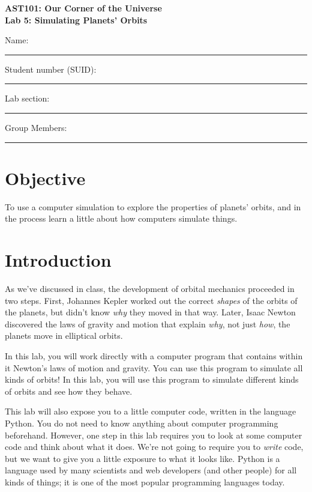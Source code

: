 \documentclass[11pt]{article}
\begin{document}
\begin{center}
\textbf{\Large
AST101: Our Corner of the Universe \\
\vspace*{0.1cm}
Lab 5: Simulating Planets' Orbits
}
\end{center}

\vspace*{0.5cm}

{\Large Name:}\vspace*{0.5cm}\\\hrule
{\Large Student number (SUID):}\vspace*{0.5cm}\\\hrule
{\Large Lab section:}\vspace*{0.5cm}\\\hrule
{\Large Group Members:}\vspace*{0.5cm}\\\hrule
\vspace*{0.5cm}


\section{Objective}

To use a computer simulation to explore the properties of planets' orbits, and in the process learn a little about how computers simulate things.

\section{Introduction}

As we've discussed in class, the development of orbital mechanics proceeded in two steps. First, Johannes Kepler worked out the correct {\it shapes} of the orbits of the planets, but didn't know {\it why} they moved in that way. Later, Isaac Newton discovered the laws of gravity and motion that explain {\it why}, not just {\it how}, the planets move in elliptical orbits.

In this lab, you will work directly with a computer program that contains within it Newton's laws of motion and gravity. You can use this program to simulate all kinds of orbits! In this lab, you will use this program to simulate different kinds of orbits and see how they behave.

This lab will also expose you to a little computer code, written in the language Python. You do not need to know anything about computer programming beforehand. However, one step in this lab requires you to look at some computer code and think about what it does. We're not going to require you to {\it write} code, but we want to give you a little exposure to what it looks like. Python is a language used by many scientists and web developers (and other people) for all kinds of things; it is one of the most popular programming languages today.
\end{document}
